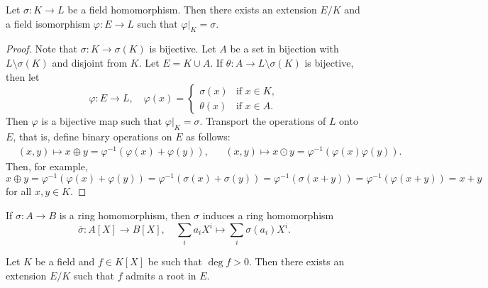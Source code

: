 \lecture 
\begin{lemma}
\label{lem:exists_bijective}
	Let $\sigma\colon K\to L$ be a field homomorphism. Then there exists an extension
	$E/K$ and a field isomorphism $\varphi\colon E\to L$
	such that $\varphi|_K=\sigma$. 
\end{lemma}

\begin{proof}
    Note that $\sigma\colon K\to\sigma(K)$ is bijective. 
    Let $A$ be a set in bijection with $L\setminus\sigma(K)$ and disjoint from $K$. 
	Let $E=K\cup A$. If $\theta\colon A\to L\setminus\sigma(K)$ is bijective, then 
	let 
	\[
		\varphi\colon E\to L,
		\quad
		\varphi(x)=\begin{cases}
			\sigma(x) & \text{if $x\in K$},\\
			\theta(x) & \text{if $x\in A$}.
		\end{cases}
	\]
	Then $\varphi$ is a bijective map such that $\varphi|_K=\sigma$. 
	Transport the operations of $L$ onto $E$, that is,  
	define binary operations on $E$ as follows: 
	\begin{align*}
		&(x,y)\mapsto x\oplus y=\varphi^{-1}(\varphi(x)+\varphi(y)), && 
		(x,y)\mapsto x\odot y=\varphi^{-1}(\varphi(x)\varphi(y)).
	\end{align*}
	Then, for example, 
	\[
		x\oplus y=\varphi^{-1}(\varphi(x)+\varphi(y))=\varphi^{-1}(\sigma(x)+\sigma(y))
		=\varphi^{-1}(\sigma(x+y))=\varphi^{-1}(\varphi(x+y))=x+y
	\]
	for all $x,y\in K$. 
\end{proof}

If $\sigma\colon A\to B$ is a ring homomorphism, then $\sigma$ induces a ring
homomorphism 
\[
\overline{\sigma}\colon A[X]\to B[X],\quad 
\sum_ia_iX^i\mapsto\sum_i\sigma(a_i)X^i.
\]

\begin{theorem}
	Let $K$ be a field and $f\in K[X]$ be such that $\deg f>0$. Then 
	there exists an extension $E/K$ such that $f$ admits a root in $E$. 
\end{theorem}

